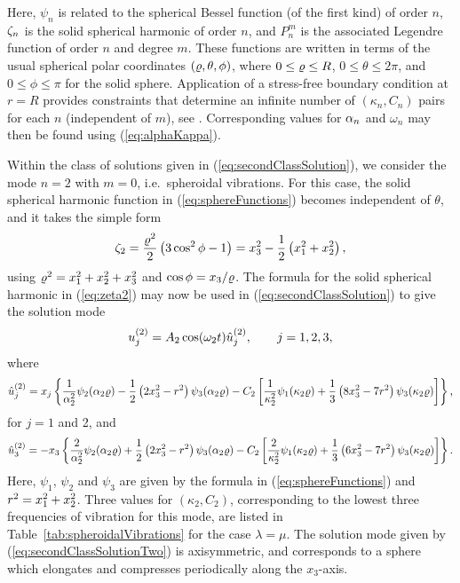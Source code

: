 Here, $\psi_n$ is related to the spherical Bessel function (of the first kind) of order $n$, $\zeta_n$ is the solid spherical harmonic of order $n$, and $P_n^m$ is the associated Legendre function of order $n$ and degree $m$.  These functions are written in terms of the usual spherical polar coordinates $(\varrho,\theta,\phi)$, where $0\le\varrho \le R$, $0\le \theta\le 2\pi$, and $0\le \phi\le \pi$ for the solid sphere.  Application of a stress-free boundary condition at $r=R$ provides constraints that determine an infinite number of $(\kappa_n,C_n)$ pairs for each $n$ (independent of $m$), see \cite{Love1944}.  Corresponding values for $\alpha_n$ and $\omega_n$ may then be found using (\ref{eq:alphaKappa}).

Within the class of solutions given in (\ref{eq:secondClassSolution}), we consider the mode $n=2$ with $m=0$, i.e.~spheroidal vibrations.  For this case, the solid spherical harmonic function in (\ref{eq:sphereFunctions}) becomes independent of $\theta$, and it takes the simple form
\begin{equation}
  \zeta_2 = {\varrho\sp2\over2}\left(3\cos\sp2\phi-1\right)=x_3^2 -{1\over2}\left(x_1^2 + x_2^2\right),
\label{eq:zeta2}
\end{equation}
using $\varrho\sp2=x_1\sp2+x_2\sp2+x_3\sp2$ and $\cos\phi=x_3/\varrho$.
The formula for the solid spherical harmonic in (\ref{eq:zeta2}) may now be used in (\ref{eq:secondClassSolution}) to give the solution mode
\begin{equation}
u_j\sp{(2)} = A_2 \cos(\omega_2 t)\hat u_j\sp{(2)},\qquad j=1,2,3,
\label{eq:secondClassSolutionTwo}
\end{equation}
where
\[
\hat u_j\sp{(2)}=x_j\left\{{1\over\alpha_2\sp2}\psi_2(\alpha_2\varrho)-{1\over2}\left(2x_3^2 -r\sp2\right)\psi_3(\alpha_2\varrho)-C_2\left[{1\over\kappa_2\sp2}\psi_1(\kappa_2\varrho)+{1\over3}\left(8x_3\sp2-7r\sp2\right)\psi_3(\kappa_2\varrho)\right]\right\},
\]
for $j=1$ and 2, and
\[
\hat u_3\sp{(2)}=-x_3\left\{{2\over\alpha_2\sp2}\psi_2(\alpha_2\varrho)+{1\over2}\left(2x_3^2 - r\sp2\right)\psi_3(\alpha_2\varrho)-C_2\left[{2\over\kappa_2\sp2}\psi_1(\kappa_2\varrho)+{1\over3}\left(6x_3\sp2-7r\sp2\right)\psi_3(\kappa_2\varrho)\right]\right\}.
\]
Here, $\psi_1$, $\psi_2$ and $\psi_3$ are given by the formula in (\ref{eq:sphereFunctions}) and $r\sp2=x_1\sp2+x_2\sp2$.  Three values for $(\kappa_2,C_2)$, corresponding to the lowest three frequencies of vibration for this mode, are listed in Table~\ref{tab:spheroidalVibrations} for the case $\lambda=\mu$.  The solution mode given by (\ref{eq:secondClassSolutionTwo}) is axisymmetric, and corresponds to a sphere which elongates and compresses periodically along the $x_3$-axis.

